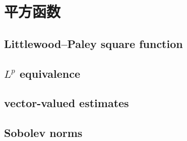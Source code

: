 \section{平方函数}
\label{b2:sec:1904}


\subsection{Littlewood–Paley square function}
\label{b2:subsec:190401}

\subsection{\texorpdfstring{\(L^p\)}{Lp} equivalence}
\label{b2:subsec:190402}

\subsection{vector-valued estimates}
\label{b2:subsec:190403}

\subsection{Sobolev norms}
\label{b2:subsec:190404}


